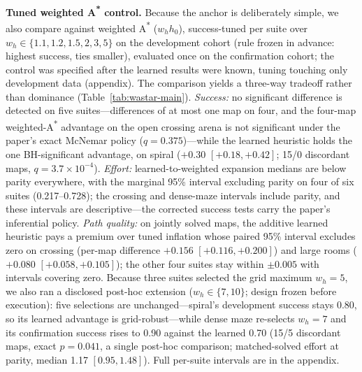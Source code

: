 \documentclass[letterpaper]{article} %
\begin{document}
\textbf{Tuned weighted A\textsuperscript{*} control.} Because the anchor is deliberately simple, we also compare against weighted A\textsuperscript{*} ($w_h h_0$), success-tuned per suite over $w_h \in \{1.1, 1.2, 1.5, 2, 3, 5\}$ on the development cohort (rule frozen in advance: highest success, ties smaller), evaluated once on the confirmation cohort; the control was specified after the learned results were known, tuning touching only development data (appendix). The comparison yields a three-way tradeoff rather than dominance (Table~\ref{tab:wastar-main}). \emph{Success:} no significant difference is detected on five suites---differences of at most one map on four, and the four-map weighted-A\textsuperscript{*} advantage on the open crossing arena is not significant under the paper's exact McNemar policy ($q{=}0.375$)---while the learned heuristic holds the one BH-significant advantage, on spiral ($+0.30$ $[+0.18,+0.42]$; 15/0 discordant maps, $q{=}3.7\times10^{-4}$). \emph{Effort:} learned-to-weighted expansion medians are below parity everywhere, with the marginal 95\% interval excluding parity on four of six suites (0.217--0.728); the crossing and dense-maze intervals include parity, and these intervals are descriptive---the corrected success tests carry the paper's inferential policy. \emph{Path quality:} on jointly solved maps, the additive learned heuristic pays a premium over tuned inflation whose paired 95\% interval excludes zero on crossing (per-map difference $+0.156$ $[+0.116,+0.200]$) and large rooms ($+0.080$ $[+0.058,+0.105]$); the other four suites stay within $\pm 0.005$ with intervals covering zero. Because three suites selected the grid maximum $w_h{=}5$, we also ran a disclosed post-hoc extension ($w_h \in \{7, 10\}$; design frozen before execution): five selections are unchanged---spiral's development success stays 0.80, so its learned advantage is grid-robust---while dense maze re-selects $w_h{=}7$ and its confirmation success rises to 0.90 against the learned 0.70 (15/5 discordant maps, exact $p{=}0.041$, a single post-hoc comparison; matched-solved effort at parity, median 1.17 $[0.95, 1.48]$). Full per-suite intervals are in the appendix.
\end{document}

